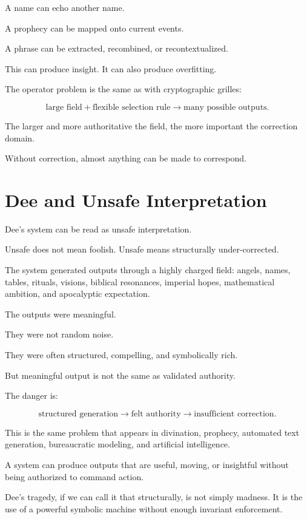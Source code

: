 \documentclass[11pt]{book}
\begin{document}
A name can echo another name.

A prophecy can be mapped onto current events.

A phrase can be extracted, recombined, or recontextualized.

This can produce insight. It can also produce overfitting.

The operator problem is the same as with cryptographic grilles:

\[
\text{large field}
+
\text{flexible selection rule}
\rightarrow
\text{many possible outputs}.
\]

The larger and more authoritative the field, the more important the correction domain.

Without correction, almost anything can be made to correspond.

\section{Dee and Unsafe Interpretation}

Dee's system can be read as unsafe interpretation.

Unsafe does not mean foolish. Unsafe means structurally under-corrected.

The system generated outputs through a highly charged field: angels, names, tables, rituals, visions, biblical resonances, imperial hopes, mathematical ambition, and apocalyptic expectation.

The outputs were meaningful.

They were not random noise.

They were often structured, compelling, and symbolically rich.

But meaningful output is not the same as validated authority.

The danger is:

\[
\text{structured generation}
\rightarrow
\text{felt authority}
\rightarrow
\text{insufficient correction}.
\]

This is the same problem that appears in divination, prophecy, automated text generation, bureaucratic modeling, and artificial intelligence.

A system can produce outputs that are useful, moving, or insightful without being authorized to command action.

Dee's tragedy, if we can call it that structurally, is not simply madness. It is the use of a powerful symbolic machine without enough invariant enforcement.
\end{document}
